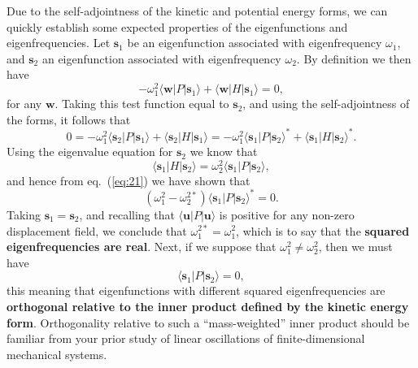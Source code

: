 Due to the self-adjointness of the kinetic and potential energy forms, we can quickly establish some expected properties of the
 eigenfunctions and eigenfrequencies. Let $\mathbf{s}_{1}$ be an eigenfunction associated with eigenfrequency $\omega_{1}$,
  and $\mathbf{s}_{2}$ an eigenfunction associated with eigenfrequency $\omega_{2}$. By definition we then have
\begin{equation}
-\omega_{1}^{2}\langle \mathbf{w}|P|\mathbf{s}_{1}\rangle+\langle \mathbf{w}|H|\mathbf{s}_{1}\rangle=0,
\label{eq:20}
\end{equation}
for any $\mathbf{w}$. Taking this test function equal to $\mathbf{s}_{2}$, and using the self-adjointness of the forms, it follows that
\begin{equation}
0=-\omega_{1}^{2}\langle \mathbf{s}_{2}|P|\mathbf{s}_{1}\rangle+\langle \mathbf{s}_{2}|H|\mathbf{s}_{1}\rangle=
-\omega_{1}^{2}\langle \mathbf{s}_{1}|P|\mathbf{s}_{2}\rangle^{*}+\langle \mathbf{s}_{1}|H|\mathbf{s}_{2}\rangle^{*}.
\label{eq:21}
\end{equation}
Using the eigenvalue equation for $\mathbf{s}_{2}$ we know that
\begin{equation}
\langle \mathbf{s}_{1}|H|\mathbf{s}_{2}\rangle=\omega_{2}^{2}\langle \mathbf{s}_{1}|P|\mathbf{s}_{2}\rangle,
\label{eq:22}
\end{equation}
and hence from eq.~(\ref{eq:21}) we have shown that
\begin{equation}
(\omega_{1}^{2}-\omega_{2}^{2*})\langle \mathbf{s}_{1}|P|\mathbf{s}_{2}\rangle^{*}=0.
\label{eq:23}
\end{equation}
Taking $\mathbf{s}_{1}=\mathbf{s}_{2}$, and recalling that $\langle \mathbf{u}|P|\mathbf{u}\rangle$ is positive for any non-zero displacement field, 
we conclude that $\omega_{1}^{2*}=\omega_{1}^{2}$, which is to say that the \textbf{squared eigenfrequencies are real}. Next, if
 we suppose that $\omega_{1}^{2}\ne\omega_{2}^{2}$, then we must have
\begin{equation}
\langle \mathbf{s}_{1}|P|\mathbf{s}_{2}\rangle=0,
\label{eq:24}
\end{equation}
this meaning that eigenfunctions with different squared eigenfrequencies are \textbf{orthogonal relative to the inner
 product defined by the kinetic energy form}. Orthogonality relative to such a ``mass-weighted'' inner product should be
familiar from your prior study of linear oscillations of finite-dimensional mechanical systems.


